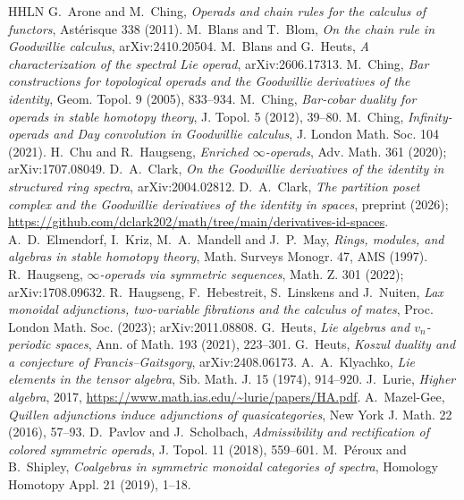 \documentclass[11pt]{amsart}
\theoremstyle{definition}
\theoremstyle{remark}
\begin{document}
\begin{thebibliography}{HHLN}
 G.~Arone and M.~Ching, \emph{Operads and chain rules for the calculus of functors}, Ast\'erisque 338 (2011).
 M.~Blans and T.~Blom, \emph{On the chain rule in Goodwillie calculus}, arXiv:2410.20504.
 M.~Blans and G.~Heuts, \emph{A characterization of the spectral Lie operad}, arXiv:2606.17313.
 M.~Ching, \emph{Bar constructions for topological operads and the Goodwillie derivatives of the identity}, Geom. Topol. 9 (2005), 833--934.
 M.~Ching, \emph{Bar-cobar duality for operads in stable homotopy theory}, J. Topol. 5 (2012), 39--80.
 M.~Ching, \emph{Infinity-operads and Day convolution in Goodwillie calculus}, J. London Math. Soc. 104 (2021).
 H.~Chu and R.~Haugseng, \emph{Enriched $\infty$-operads}, Adv. Math. 361 (2020); arXiv:1707.08049.
 D.~A.~Clark, \emph{On the Goodwillie derivatives of the identity in structured ring spectra}, arXiv:2004.02812.
 D.~A.~Clark, \emph{The partition poset complex and the Goodwillie derivatives of the identity in spaces}, preprint (2026); \url{https://github.com/dclark202/math/tree/main/derivatives-id-spaces}.
 A.~D.~Elmendorf, I.~Kriz, M.~A.~Mandell and J.~P.~May, \emph{Rings, modules, and algebras in stable homotopy theory}, Math. Surveys Monogr. 47, AMS (1997).
 R.~Haugseng, \emph{$\infty$-operads via symmetric sequences}, Math. Z. 301 (2022); arXiv:1708.09632.
 R.~Haugseng, F.~Hebestreit, S.~Linskens and J.~Nuiten, \emph{Lax monoidal adjunctions, two-variable fibrations and the calculus of mates}, Proc. London Math. Soc. (2023); arXiv:2011.08808.
 G.~Heuts, \emph{Lie algebras and $v_n$-periodic spaces}, Ann. of Math. 193 (2021), 223--301.
 G.~Heuts, \emph{Koszul duality and a conjecture of Francis--Gaitsgory}, arXiv:2408.06173.
 A.~A.~Klyachko, \emph{Lie elements in the tensor algebra}, Sib. Math. J. 15 (1974), 914--920.
 J.~Lurie, \emph{Higher algebra}, 2017, \url{https://www.math.ias.edu/~lurie/papers/HA.pdf}.
 A.~Mazel-Gee, \emph{Quillen adjunctions induce adjunctions of quasicategories}, New York J. Math. 22 (2016), 57--93.
 D.~Pavlov and J.~Scholbach, \emph{Admissibility and rectification of colored symmetric operads}, J. Topol. 11 (2018), 559--601.
 M.~P\'eroux and B.~Shipley, \emph{Coalgebras in symmetric monoidal categories of spectra}, Homology Homotopy Appl. 21 (2019), 1--18.
\end{thebibliography}
\end{document}

